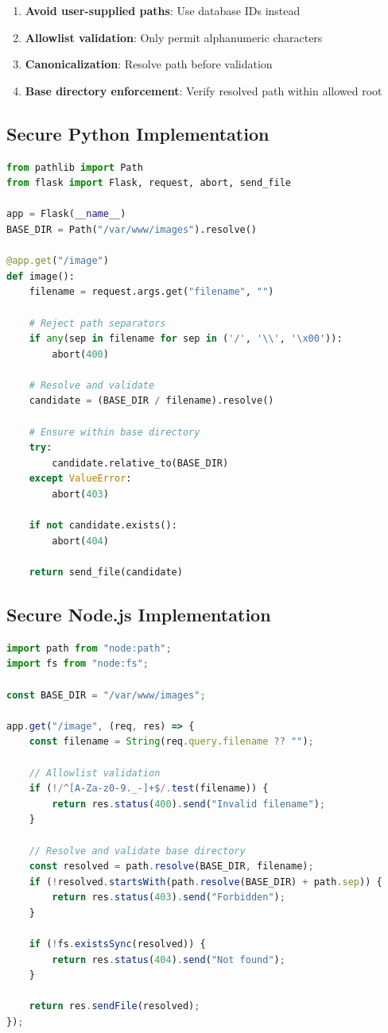 \documentclass[11pt,letterpaper]{article}
\begin{document}
\begin{enumerate}
  \item \textbf{Avoid user-supplied paths}: Use database IDs instead
  \item \textbf{Allowlist validation}: Only permit alphanumeric characters
  \item \textbf{Canonicalization}: Resolve path before validation
  \item \textbf{Base directory enforcement}: Verify resolved path within allowed root
\end{enumerate}

\subsection{Secure Python Implementation}

\begin{lstlisting}[language=python,caption={Python: Secure file serving with pathlib}]
from pathlib import Path
from flask import Flask, request, abort, send_file

app = Flask(__name__)
BASE_DIR = Path("/var/www/images").resolve()

@app.get("/image")
def image():
    filename = request.args.get("filename", "")

    # Reject path separators
    if any(sep in filename for sep in ('/', '\\', '\x00')):
        abort(400)

    # Resolve and validate
    candidate = (BASE_DIR / filename).resolve()

    # Ensure within base directory
    try:
        candidate.relative_to(BASE_DIR)
    except ValueError:
        abort(403)

    if not candidate.exists():
        abort(404)

    return send_file(candidate)
\end{lstlisting}

\subsection{Secure Node.js Implementation}

\begin{lstlisting}[language=javascript,caption={Node.js: Secure file serving}]
import path from "node:path";
import fs from "node:fs";

const BASE_DIR = "/var/www/images";

app.get("/image", (req, res) => {
    const filename = String(req.query.filename ?? "");

    // Allowlist validation
    if (!/^[A-Za-z0-9._-]+$/.test(filename)) {
        return res.status(400).send("Invalid filename");
    }

    // Resolve and validate base directory
    const resolved = path.resolve(BASE_DIR, filename);
    if (!resolved.startsWith(path.resolve(BASE_DIR) + path.sep)) {
        return res.status(403).send("Forbidden");
    }

    if (!fs.existsSync(resolved)) {
        return res.status(404).send("Not found");
    }

    return res.sendFile(resolved);
});
\end{lstlisting}
\end{document}
